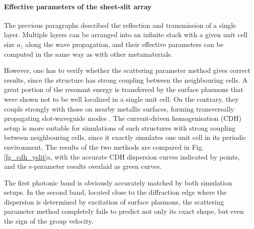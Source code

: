 \paragraph{Effective parameters of the sheet-slit array}%
The previous paragraphs described the reflection and transmission of a single layer. Multiple layers can be arranged into an infinite stack with a given unit cell size $a_z$ along the wave propagation, and their effective parameters can be computed in the same way as with other metamaterials. 

However, one has to verify whether the scattering parameter method gives correct results, since the structure has strong coupling between the neighbouring cells. A great portion of the resonant energy is transferred by the surface plasmons that were shown not to be well localized in a single unit cell. On the contrary, they couple strongly with those on nearby metallic surfaces, forming transversally propagating slot-waveguide modes \cite{weiner2011electromagnetics}.
The current-driven homogenisation (CDH) setup is more suitable for simulations of such structures  with strong coupling between neighbouring cells, since it exactly simulates one unit cell in its periodic environment. The results of the two methods are compared in Fig. \ref{fg_cdh_yslit}a, with the accurate CDH dispersion curves indicated by points, and the s-parameter results overlaid as green curves.  %

The first photonic band is obviously accurately matched by both simulation setups. In the second band, located close to the diffraction edge where the dispersion is determined by excitation of surface plasmons, the scattering parameter method completely fails to predict not only its exact shape, but even the sign of the group velocity. 



